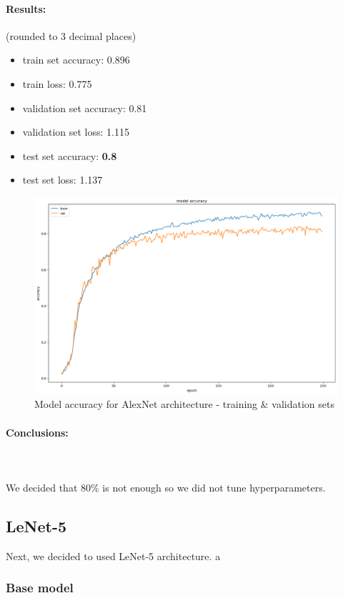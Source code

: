 \documentclass[12pt]{article}
\begin{document}
      \paragraph{Results:} (rounded to 3 decimal places)
        \begin{itemize}
          \item train set accuracy: 0.896
          \item train loss: 0.775
          \item validation set accuracy: 0.81
          \item validation set loss: 1.115
          \item test set accuracy: \textbf{0.8}
          \item test set loss: 1.137
        \end{itemize}
            \begin{figure}[H]
              \includegraphics[width=\linewidth]{images/alex-net.png}
              \caption{Model accuracy for AlexNet architecture - training \& validation sets}
              \label{fig:alex-net}
            \end{figure}
      \paragraph{Conclusions:} \mbox{} \\\\
      We decided that 80\% is not enough so we did not tune hyperparameters.
    \subsection{LeNet-5}
      Next, we decided to used LeNet-5 architecture. a
      \subsubsection{Base model}
        \inputminted[linenos]{python}{code/lenet.py}
\end{document}
